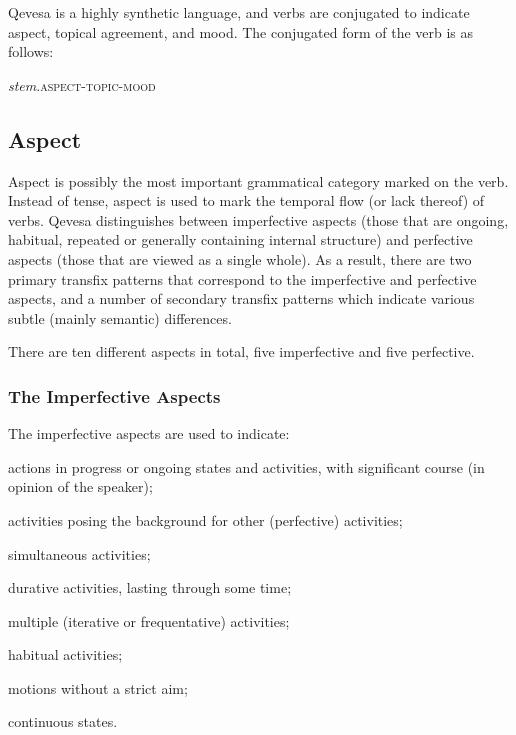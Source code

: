 \documentclass[grammar]{subfiles}
\begin{document}
  Qevesa is a highly synthetic language, and verbs are conjugated to indicate aspect, topical agreement, and mood. The conjugated form of the verb is as follows:

  \begin{exe}
    \ex\label{exe:vm_conjugation} \textit{stem}\textsc{.aspect-topic-mood}
  \end{exe}

  \subsection{Aspect}
  \label{ssec:vm_aspect}

  Aspect is possibly the most important grammatical category marked on the verb. 
  Instead of tense, aspect is used to mark the temporal flow (or lack thereof) of verbs. 
  Qevesa distinguishes between imperfective aspects (those that are ongoing, habitual, repeated or generally containing internal structure) and perfective aspects (those that are viewed as a single whole). 
  As a result, there are two primary transfix patterns that correspond to the imperfective and perfective aspects, and a number of secondary transfix patterns which indicate various subtle (mainly semantic) differences.	

  There are ten different aspects in total, five imperfective and five perfective.

  \subsubsection{The Imperfective Aspects}
  \label{sssec:vm_imperfective}

  The imperfective aspects are used to indicate:

  \begin{itemize*}
    \item actions in progress or ongoing states and activities, with significant course (in opinion of the speaker);
    \item activities posing the background for other (perfective) activities;
    \item simultaneous activities;
    \item durative activities, lasting through some time;
    \item multiple (iterative or frequentative) activities;
    \item habitual activities;
    \item motions without a strict aim;
    \item continuous states.
  \end{itemize*}
\end{document}
